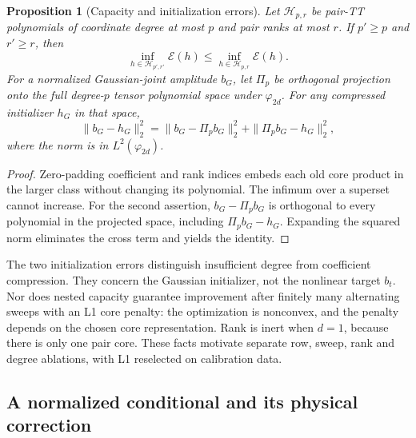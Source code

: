 \documentclass[11pt]{article}
\newtheorem{proposition}{Proposition}
\begin{document}
\begin{proposition}[Capacity and initialization errors]
\label{prop:a11-capacity}
Let $\mathcal H_{p,r}$ be pair-TT polynomials of coordinate degree at most
$p$ and pair ranks at most $r$. If $p'\ge p$ and $r'\ge r$, then
\begin{equation}
 \inf_{h\in\mathcal H_{p',r'}}\mathcal E(h)
 \le \inf_{h\in\mathcal H_{p,r}}\mathcal E(h).
 \label{eq:a11-capacity}
\end{equation}
For a normalized Gaussian-joint amplitude $b_G$, let $\Pi_p$ be orthogonal
projection onto the full degree-$p$ tensor polynomial space under
$\varphi_{2d}$. For any compressed initializer $h_G$ in that space,
\begin{equation}
 \|b_G-h_G\|_2^2=
 \|b_G-\Pi_pb_G\|_2^2+\|\Pi_pb_G-h_G\|_2^2,
 \label{eq:a11-projection}
\end{equation}
where the norm is in $L^2(\varphi_{2d})$.
\end{proposition}
\begin{proof}
Zero-padding coefficient and rank indices embeds each old core product in
the larger class without changing its polynomial. The infimum over a
superset cannot increase. For the second assertion,
$b_G-\Pi_pb_G$ is orthogonal to every polynomial in the projected space,
including $\Pi_pb_G-h_G$. Expanding the squared norm eliminates the cross
term and yields the identity.
\end{proof}

The two initialization errors distinguish insufficient degree from coefficient
compression. They concern the Gaussian initializer, not the nonlinear target
$b_t$. Nor does nested capacity guarantee improvement after finitely many
alternating sweeps with an L1 core penalty: the optimization is nonconvex,
and the penalty depends on the chosen core representation. Rank is inert
when $d=1$, because there is only one pair core. These facts motivate separate
row, sweep, rank and degree ablations, with L1 reselected on calibration data.

\subsection{A normalized conditional and its physical correction}
\end{document}
